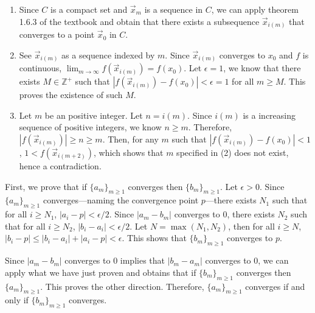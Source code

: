 \documentclass{homework}
\begin{document}
\begin{problem}{8}
\begin{enumerate}
\item Since $C$ is a compact set and $\vec{x}_m$ is a sequence in $C$, we can apply theorem 1.6.3 of the textbook and obtain that there exists a subsequence $\vec{x}_{i(m)}$ that converges to a point $\vec{x}_0$ in $C$. \QED
\item See $\vec{x}_{i(m)}$ as a sequence indexed by $m$. Since $\vec{x}_{i(m)}$ converges to $x_0$ and $f$ is continuous, $\lim_{m \to \infty} f(\vec{x}_{i(m)}) = f(x_0)$. Let $\epsilon = 1$, we know that there exists $M \in \mathbb{Z}^{+}$ such that $|f(\vec{x}_{i(m)}) - f(x_0)| < \epsilon = 1$ for all $m \geq M$. This proves the existence of such $M$. \QED
\item Let $m$ be an positive integer. Let $n = i(m)$. Since $i(m)$ is a increasing sequence of positive integers, we know $n \geq m$. Therefore, $|f(\vec{x}_{i(m)})| \geq n \geq m$. Then, for any $m$ such that $|f(\vec{x}_{i(m)}) - f(x_0)| < 1$, $1 < f(\vec{x}_{i(m+2)})$, which shows that $m$ specified in (2) does not exist, hence a contradiction.
\end{enumerate}
\end{problem}

\begin{problem}{9}
First, we prove that if $\{a_m\}_{m\geq1}$ converges then $\{b_m\}_{m\geq1}$. Let $\epsilon > 0$. Since $\{a_m\}_{m\geq1}$ converges---naming the convergence point $p$---there exists $N_1$ such that for all $i \geq N_1$, $|a_i - p| < \epsilon / 2$. Since $|a_m - b_m|$ converges to $0$, there exists $N_2$ such that for all $i \geq N_2$, $|b_i - a_i| < \epsilon / 2$. Let $N = \max(N_1, N_2)$, then for all $i \geq N$, $|b_i - p| \leq |b_i - a_i| + |a_i - p| < \epsilon$. This shows that $\{b_m\}_{m\geq1}$ converges to $p$.

Since $|a_m - b_m|$ converges to $0$ implies that $|b_m - a_m|$ converges to $0$, we can apply what we have just proven and obtains that if $\{b_m\}_{m\geq1}$ converges then $\{a_m\}_{m\geq1}$. This proves the other direction. Therefore, $\{a_m\}_{m\geq1}$ converges if and only if $\{b_m\}_{m\geq1}$ converges. \QED
\end{problem}
\end{document}
